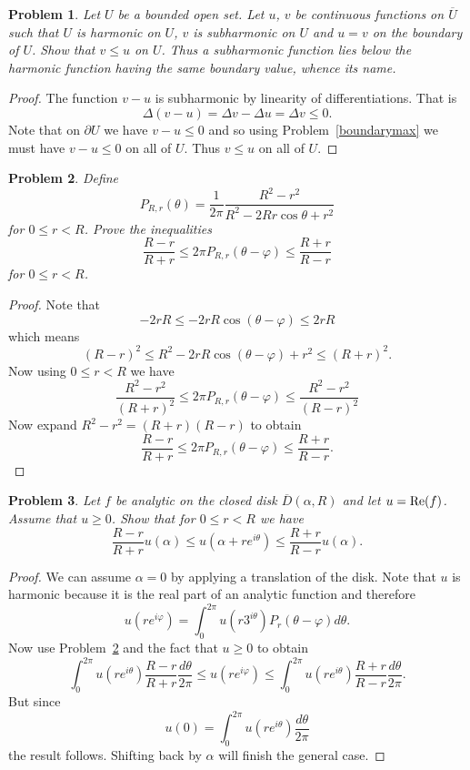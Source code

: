 \documentclass{article}
\newtheorem{problem}{Problem}
\begin{document}
\begin{problem}
Let $U$ be a bounded open set. Let $u$, $v$ be continuous functions on $\overline{U}$ such that $U$ is harmonic on $U$, $v$ is subharmonic on $U$ and $u = v$ on the boundary of $U$. Show that $v \leq u$ on $U$. Thus a subharmonic function lies below the harmonic function having the same boundary value, whence its name.
\end{problem}
\begin{proof}
The function $v-u$ is subharmonic by linearity of differentiations. That is
\[
\Delta (v-u) = \Delta v - \Delta u = \Delta v \leq 0.
\]
Note that on $\partial U$ we have $v-u \leq 0$ and so using Problem~\ref{boundarymax} we must have $v-u \leq 0$ on all of $U$. Thus $v \leq u$ on all of $U$.
\end{proof}

\begin{problem}
\label{inequality}
Define
\[
P_{R,r}(\theta) = \frac{1}{2 \pi} \frac{R^2 - r^2}{R^2 - 2Rr \cos \theta + r^2}
\]
for $0 \leq r < R$. Prove the inequalities
\[
\frac{R-r}{R+r} \leq 2 \pi P_{R,r} (\theta - \varphi) \leq \frac{R+r}{R-r}
\]
for $0 \leq r < R$.
\end{problem}
\begin{proof}
Note that
\[
-2rR \leq -2rR\cos(\theta-\varphi) \leq 2rR
\]
which means
\[
(R-r)^2 \leq R^2 - 2rR\cos(\theta-\varphi) + r^2 \leq (R+r)^2.
\]
Now using $0 \leq r < R$ we have
\[
\frac{R^2-r^2}{(R+r)^2} \leq 2 \pi P_{R,r} (\theta - \varphi) \leq \frac{R^2 - r^2}{(R-r)^2}
\]
Now expand $R^2 - r^2 = (R+r)(R-r)$ to obtain
\[
\frac{R-r}{R+r} \leq 2 \pi P_{R,r} (\theta - \varphi) \leq \frac{R+r}{R-r}.
\]
\end{proof}

\begin{problem}
Let $f$ be analytic on the closed disk $\overline{D}(\alpha, R)$ and let $u = \textup{Re} (f)$. Assume that $u \geq 0$. Show that for $0 \leq r < R$ we have
\[
\frac{R-r}{R+r} u(\alpha) \leq u(\alpha + re^{i \theta}) \leq \frac{R+r}{R-r} u(\alpha).
\]
\end{problem}
\begin{proof}
We can assume $\alpha = 0$ by applying a translation of the disk. Note that $u$ is harmonic because it is the real part of an analytic function and therefore
\[
u(re^{i \varphi}) = \int_0^{2 \pi} u(r3^{i \theta})P_r(\theta-\varphi)d\theta.
\]
Now use Problem~\ref{inequality} and the fact that $u \geq 0$ to obtain
\[
\int_{0}^{2 \pi} u(re^{i\theta}) \frac{R-r}{R+r}\frac{d\theta}{2 \pi} \leq u(re^{i \varphi}) \leq \int_0^{2 \pi} u(re^{i \theta}) \frac{R+r}{R-r} \frac{d \theta}{2 \pi}.
\]
But since
\[
u(0) = \int_0^{2 \pi} u(re^{i \theta}) \frac{d \theta}{2 \pi}
\]
the result follows. Shifting back by $\alpha$ will finish the general case.
\end{proof}
\end{document}
